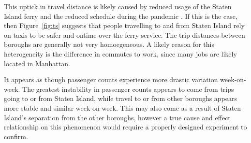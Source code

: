 \documentclass[11pt]{article}
\begin{document}


This uptick in travel distance is likely caused by reduced usage of the Staten Island ferry and the reduced schedule during the pandemic \cite{dot2020}.
If this is the case, then Figure~\ref{fig:ts} suggests that people travelling to and from Staten Island rely on taxis to be safer and ontime over the ferry service.
The trip distances between boroughs are generally not very homoegeneous. 
A likely reason for this heterogeneity is the difference in commutes to work, since
many jobs are likely located in Manhattan.

It appears as though passenger counts experience more drastic variation week-on-week.
The greatest instability in passenger counts appears to come from trips going to or from Staten Island,
while travel to or from other boroughs appears more stable and similar week-on-week. 
This may also come as a result of Staten Island's separation from the other boroughs,
however a true cause and effect relationship on this phenomenon would require a properly designed experiment to confirm.
\end{document}

